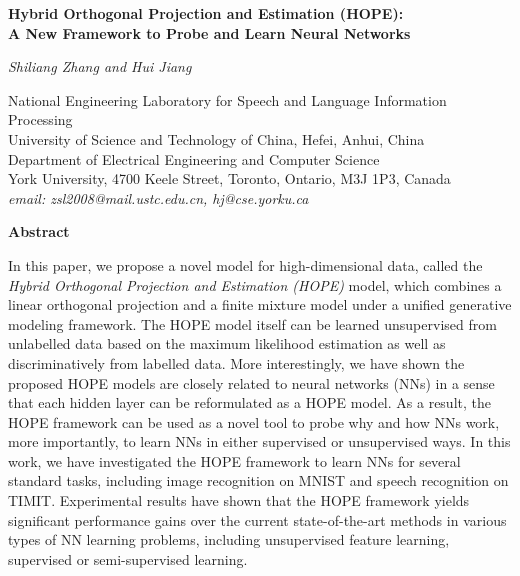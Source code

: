 \documentclass[11pt]{article}
\begin{document}
\newtheorem{definition}{Definition}
\newtheorem{problem}{Problem}

\begin{center}
\Large \bf
Hybrid Orthogonal Projection and Estimation (HOPE): \\
A New Framework to Probe and Learn Neural Networks
\end{center}

\smallskip

\begin{center}
\large
 \em Shiliang Zhang and Hui Jiang \\
\end{center}
\begin{center}
\large
 National Engineering Laboratory for Speech and Language Information Processing \\
University of Science and Technology of China, Hefei, Anhui, China \\

 Department of Electrical Engineering and Computer Science\\
York University,  4700 Keele Street, Toronto, Ontario, M3J 1P3, Canada \\

{\it email: zsl2008@mail.ustc.edu.cn, hj@cse.yorku.ca}
\end{center}



\begin{center}
\bf Abstract
\end{center}

In this paper, we propose a novel model for high-dimensional data, called the {\em Hybrid Orthogonal Projection and Estimation (HOPE)} model, which combines a linear orthogonal projection and a finite mixture model under a unified generative modeling framework. The HOPE model itself can be learned unsupervised from unlabelled data based on the maximum likelihood estimation as well as discriminatively from labelled data. More interestingly, we have shown the proposed HOPE models are closely related to neural networks (NNs) in a sense that each hidden layer can be  reformulated as a HOPE model. As a result, the HOPE framework can be used as a novel tool to probe why and how NNs work, more importantly, to learn NNs in either supervised or unsupervised ways.  In this work, we have investigated the HOPE framework to learn NNs for several standard tasks, including image recognition on MNIST and speech recognition on TIMIT. Experimental results have shown that the HOPE framework yields significant performance gains over the current state-of-the-art methods in various types of NN learning problems, including unsupervised feature learning, supervised or semi-supervised learning. 
\end{document}
